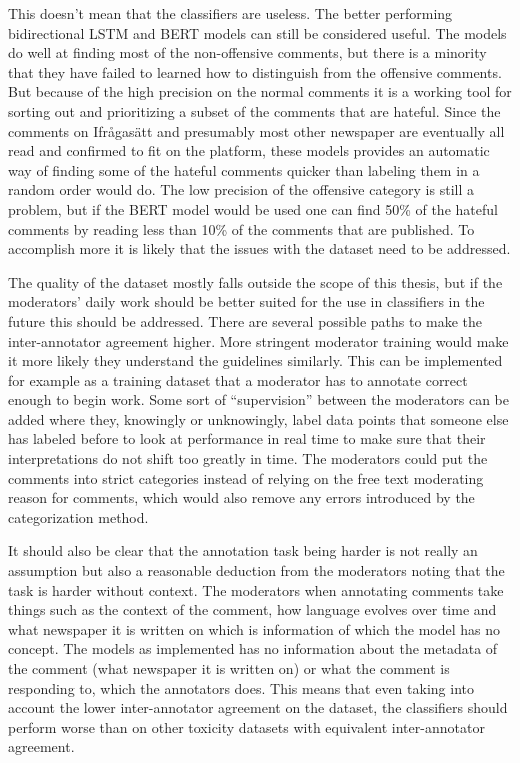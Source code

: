 \documentclass[nofilelist]{cslthse-msc}
\begin{document}
This doesn't mean that the classifiers are useless. The better performing bidirectional LSTM and BERT models can still be considered useful. The models do well at finding most of the non-offensive comments, but there is a minority that they have failed to learned how to distinguish from the offensive comments. But because of the high precision on the normal comments it is a working tool for sorting out and prioritizing a subset of the comments that are hateful. Since the comments on Ifrågasätt and presumably most other newspaper are eventually all read and confirmed to fit on the platform, these models provides an automatic way of finding some of the hateful comments quicker than labeling them in a random order would do. The low precision of the offensive category is still a problem, but if the BERT model would be used one can find 50\% of the hateful comments by reading less than 10\% of the comments that are published. To accomplish more it is likely that the issues with the dataset need to be addressed.

The quality of the dataset mostly falls outside the scope of this thesis, but if the moderators' daily work should be better suited for the use in classifiers in the future this should be addressed. There are several possible paths to make the inter-annotator agreement higher. More stringent moderator training would make it more likely they understand the guidelines similarly. This can be implemented for example as a training dataset that a moderator has to annotate correct enough to begin work. Some sort of ``supervision'' between the moderators can be added where they, knowingly or unknowingly, label data points that someone else has labeled before to look at performance in real time to make sure that their interpretations do not shift too greatly in time. The moderators could put the comments into strict categories instead of relying on the free text moderating reason for comments, which would also remove any errors introduced by the categorization method.

It should also be clear that the annotation task being harder is not really an assumption but also a reasonable deduction from the moderators noting that the task is harder without context. The moderators when annotating comments take things such as the context of the comment, how language evolves over time and what newspaper it is written on which is information of which the model has no concept. The models as implemented has no information about the metadata of the comment (what newspaper it is written on) or what the comment is responding to, which the annotators does. This means that even taking into account the lower inter-annotator agreement on the dataset, the classifiers should perform worse than on other toxicity datasets with equivalent inter-annotator agreement. 
\end{document}
